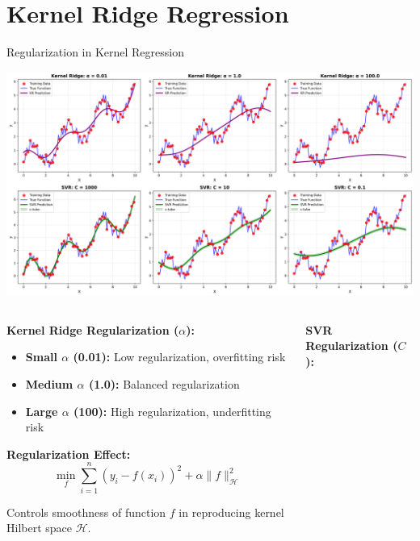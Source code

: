 \documentclass[8pt,aspectratio=1610]{beamer}
\begin{document}
\section{Kernel Ridge Regression}

\begin{frame}{Regularization in Kernel Regression}
\begin{center}
\includegraphics[width=\textwidth]{../figures/regularization_comparison.png}
\end{center}

\begin{columns}[t]
\begin{column}{0.48\textwidth}
\textbf{Kernel Ridge Regularization ($\alpha$):}
\vspace{0.2cm}

\begin{itemize}
\setlength{\itemsep}{1pt}
\item \textbf{Small $\alpha$ (0.01):} Low regularization, overfitting risk
\item \textbf{Medium $\alpha$ (1.0):} Balanced regularization
\item \textbf{Large $\alpha$ (100):} High regularization, underfitting risk
\end{itemize}

\vspace{0.3cm}
\textbf{Regularization Effect:}
$$\min_f \sum_{i=1}^n (y_i - f(x_i))^2 + \alpha \|f\|_{\mathcal{H}}^2$$

Controls smoothness of function $f$ in reproducing kernel Hilbert space $\mathcal{H}$.
\end{column}

\begin{column}{0.48\textwidth}
\textbf{SVR Regularization ($C$):}
\vspace{0.2cm}


\end{column}
\end{columns}
\end{frame}
\end{document}
